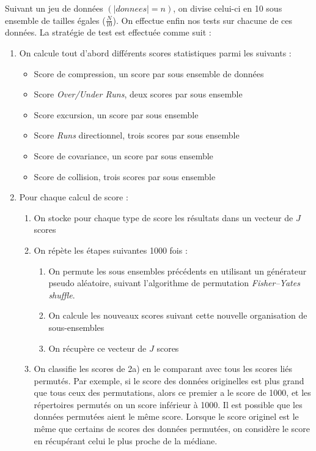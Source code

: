 Suivant un jeu de données $(|donnees|=n)$, on divise celui-ci en 10 sous ensemble de tailles égales ($\frac{N}{10}$). On effectue enfin nos tests sur chacune de ces données. La stratégie de test est effectuée comme suit : 
\begin{enumerate}
\item On calcule tout d'abord différents scores statistiques parmi les suivants :
	\begin{itemize}
	\item Score de compression, un score par sous ensemble de données
	\item Score \textit{Over/Under Runs}, deux scores par sous ensemble
	\item Score excursion, un score par sous ensemble
	\item Score \textit{Runs} directionnel, trois scores par sous ensemble
	\item Score de covariance, un score par sous ensemble 
	\item Score de collision, trois scores par sous ensemble\\
	\end{itemize}
	
\item Pour chaque calcul de score : 
	\begin{enumerate}
	\item On stocke pour chaque type de score les résultats dans un vecteur de $J$ scores
	\item On répète les étapes suivantes 1000 fois :
		\begin{enumerate}
		\item On permute les sous ensembles précédents en utilisant un générateur pseudo aléatoire, suivant l'algorithme de permutation \textit{Fisher–Yates shuffle}. 
		\item On calcule les nouveaux scores suivant cette nouvelle organisation de sous-ensembles
		\item On récupère ce vecteur de $J$ scores
		\end{enumerate}
	\item On classifie les scores de 2a) en le comparant avec tous les scores liés permutés. Par exemple, si le score des données originelles est plus grand que tous ceux des permutations, alors ce premier a le score de 1000, et les répertoires permutés on un score inférieur à 1000. Il est possible que les données permutées aient le même score. Lorsque le score originel est le même que certains de scores des données permutées, on considère le score en récupérant celui le plus proche de la médiane. \\
	

\end{enumerate}
\end{enumerate}
